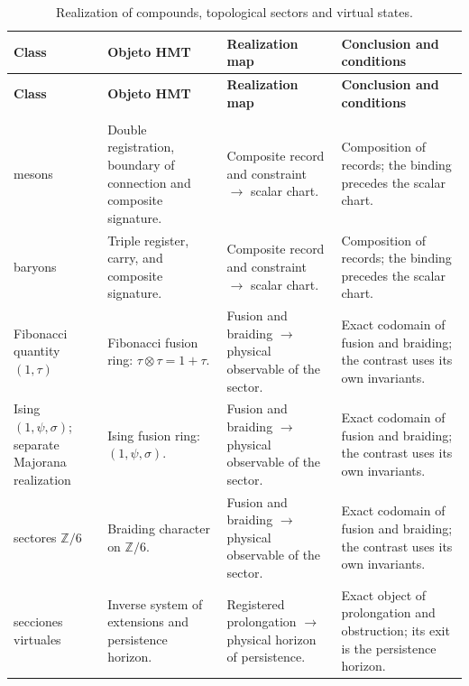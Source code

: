 \begingroup
\setlength{\tabcolsep}{4.5pt}
\renewcommand{\arraystretch}{1.28}
\begin{longtable}{@{}>{\raggedright\arraybackslash}p{}>{\raggedright\arraybackslash}p{}>{\raggedright\arraybackslash}p{}>{\raggedright\arraybackslash}p{}@{}}
\caption{Realization of compounds, topological sectors and virtual states.}\label{tab:masas-realizacion-no-escalar}\\
\toprule
\textbf{Class} & \textbf{Objeto HMT} & \textbf{Realization map} & \textbf{Conclusion and conditions} \\
\midrule
\endfirsthead
\toprule
\textbf{Class} & \textbf{Objeto HMT} & \textbf{Realization map} & \textbf{Conclusion and conditions} \\
\midrule
\endhead
\midrule
\multicolumn{4}{r}{\footnotesize Continues on the following page.}\\
\endfoot
\bottomrule
\endlastfoot
mesons & Double registration, boundary of connection and composite signature. & Composite record and constraint $\to$ scalar chart. & Composition of records; the binding precedes the scalar chart. \\
baryons & Triple register, carry, and composite signature. & Composite record and constraint $\to$ scalar chart. & Composition of records; the binding precedes the scalar chart. \\
Fibonacci quantity $(1,\tau)$ & Fibonacci fusion ring: $\tau\otimes\tau=1+\tau$. & Fusion and braiding $\to$ physical observable of the sector. & Exact codomain of fusion and braiding; the contrast uses its own invariants. \\
Ising $(1,\psi,\sigma)$; separate Majorana realization & Ising fusion ring: $(1,\psi,\sigma)$. & Fusion and braiding $\to$ physical observable of the sector. & Exact codomain of fusion and braiding; the contrast uses its own invariants. \\
sectores $\mathbb Z/6$ & Braiding character on $\mathbb Z/6$. & Fusion and braiding $\to$ physical observable of the sector. & Exact codomain of fusion and braiding; the contrast uses its own invariants. \\
secciones virtuales & Inverse system of extensions and persistence horizon. & Registered prolongation $\to$ physical horizon of persistence. & Exact object of prolongation and obstruction; its exit is the persistence horizon. \\
\end{longtable}
\endgroup
